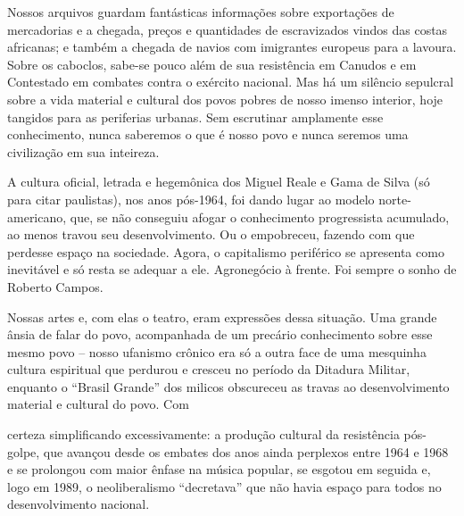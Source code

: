 Nossos arquivos guardam fantásticas informações sobre exportações de
mercadorias e a chegada, preços e quantidades de escravizados vindos das
costas africanas; e também a chegada de navios com imigrantes europeus
para a lavoura. Sobre os caboclos, sabe-se pouco além de sua resistência em Canudos e em Contestado em combates contra o exército nacional. Mas há um 
silêncio sepulcral sobre a vida material e cultural dos povos pobres de
nosso imenso interior, hoje tangidos para as periferias urbanas. Sem escrutinar amplamente esse conhecimento, nunca saberemos o que é nosso povo e
nunca seremos uma civilização em sua inteireza.

A cultura oficial, letrada e hegemônica dos Miguel Reale e Gama de Silva
(só para citar paulistas), nos anos pós-1964, foi dando lugar ao modelo
norte-americano, que, se não conseguiu afogar o conhecimento progressista
acumulado, ao menos travou seu desenvolvimento. Ou o empobreceu, fazendo com que perdesse
espaço na sociedade. Agora, o capitalismo periférico se apresenta como
inevitável e só resta se adequar a ele. Agronegócio à frente. Foi sempre
o sonho de Roberto Campos.

Nossas artes e, com elas o teatro, eram expressões dessa situação. Uma
grande ânsia de falar do povo, acompanhada de um precário conhecimento
sobre esse mesmo povo -- nosso ufanismo crônico era só a outra face de
uma mesquinha cultura espiritual que perdurou e cresceu no período da
Ditadura Militar, enquanto o “Brasil Grande” dos milicos obscureceu as
travas ao desenvolvimento material e cultural do povo. Com

\column

\noindent{}certeza
simplificando excessivamente: a produção cultural da resistência pós-golpe,
que avançou desde os embates dos anos ainda perplexos entre 1964 e
1968 e se prolongou com maior ênfase na música popular, se esgotou
em seguida e, logo em 1989, o neoliberalismo “decretava” que não havia
espaço para todos no desenvolvimento nacional.


